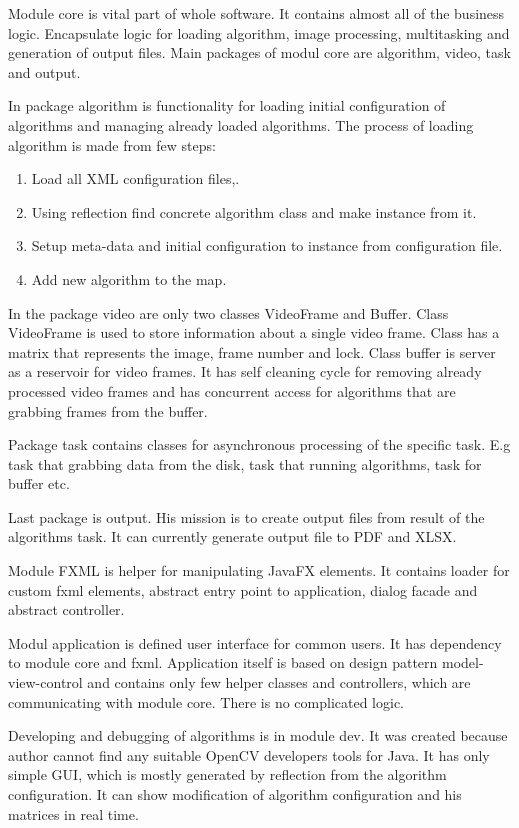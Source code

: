 \documentclass[twoside]{article}
\begin{document}
\begin{multicols}{2}
Module core is vital part of whole software. It contains almost all of the business logic. Encapsulate logic for loading algorithm, image processing, multitasking and generation of output files. Main packages of modul core are algorithm, video, task and output.

In package algorithm is functionality for loading initial configuration of algorithms and managing already loaded algorithms. The process of loading algorithm is made from few steps:
\begin{enumerate}
	\item Load all XML configuration files,.
	\item Using reflection find concrete algorithm class and make instance from it.
	\item Setup meta-data and initial configuration to instance from configuration file.
	\item Add new algorithm to the map.
\end{enumerate}

In the package video are only two classes VideoFrame and Buffer. Class VideoFrame is used to store information about a single video frame. Class has a matrix that represents the image, frame number and lock. Class buffer is server as a reservoir for video frames. It has self cleaning cycle for removing already processed video frames and has concurrent access for algorithms that are grabbing frames from the buffer.

Package task contains classes for asynchronous processing of the specific task. E.g task that grabbing data from the disk, task that running algorithms, task for buffer etc.

Last package is output. His mission is to create output files from result of the algorithms task. It can currently generate output file to PDF and XLSX. 

Module FXML is helper for manipulating JavaFX elements. It contains loader for custom fxml elements, abstract entry point to application, dialog facade and abstract controller.

Modul application is defined user interface for common users. It has dependency to module core and fxml. Application itself is based on design pattern model-view-control and contains only few helper classes and controllers, which are communicating with module core. There is no complicated logic.

Developing and debugging of algorithms is in module dev. It was created because author cannot find any suitable OpenCV developers tools for Java. It has only simple GUI, which is mostly generated by reflection from the algorithm configuration. It can show modification of algorithm configuration and his matrices in real time.


\end{multicols}
\end{document}
